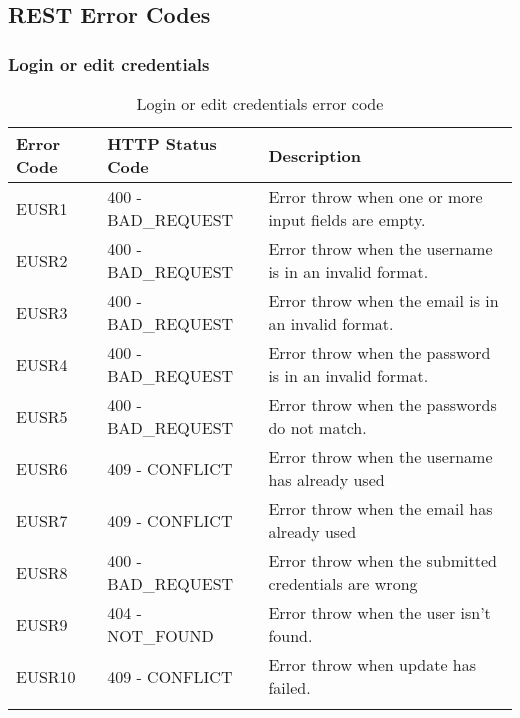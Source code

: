 \subsection{REST Error Codes}




\subsubsection{Login or edit credentials}
\begin{longtable}{|p{}|p{} |p{}|} 
    \hline
    \textbf{Error Code} & \textbf{HTTP Status Code} & \textbf{Description} \\\hline
    EUSR1 & 400 - BAD\_REQUEST & Error throw when one or more input fields are empty.\\\hline
    EUSR2 & 400 - BAD\_REQUEST & Error throw when the username is in an invalid format.\\\hline
    EUSR3 & 400 - BAD\_REQUEST & Error throw when the email is in an invalid format.\\\hline
    EUSR4 & 400 - BAD\_REQUEST & Error throw when the password is in an invalid format.\\\hline
    EUSR5 & 400 - BAD\_REQUEST & Error throw when the passwords do not match.\\\hline
    EUSR6 & 409 - CONFLICT & Error throw when the username has already used\\\hline
    EUSR7 & 409 - CONFLICT & Error throw when the email has already used\\\hline
    EUSR8 & 400 - BAD\_REQUEST & Error throw when the submitted credentials are wrong\\\hline
    EUSR9 & 404 - NOT\_FOUND & Error throw when the user isn't found.\\\hline
    EUSR10 & 409 - CONFLICT & Error throw when update has failed.\\\hline

    
    \caption{Login or edit credentials error code}
    \label{tab:Login_or_edit_credentials_error_code}
\end{longtable}
